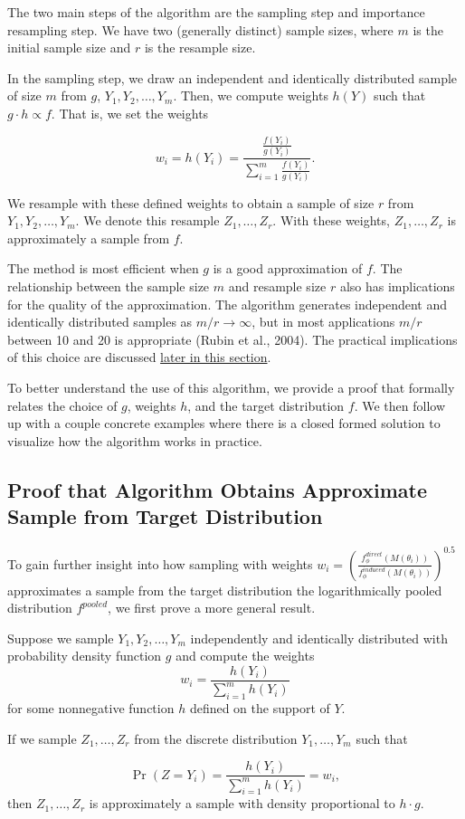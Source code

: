 \documentclass[12pt,twoside]{smiththesis}
\begin{document}
The two main steps of the algorithm are the sampling step and importance resampling step. We have two (generally distinct) sample sizes, where \(m\) is the initial sample size and \(r\) is the resample size.

In the sampling step, we draw an independent and identically distributed sample of size \(m\) from \(g\), \(Y_1, Y_2, \dots, Y_m\). Then, we compute weights \(h(Y)\) such that \(g \cdot h \propto f\). That is, we set the weights

\[w_i = h(Y_i) = \dfrac{\frac{f(Y_i) } {g(Y_i)} }{\sum_{i=1}^m\frac{f(Y_i) } {g(Y_i)} }.\]

We resample with these defined weights to obtain a sample of size \(r\) from \(Y_1, Y_2, \dots, Y_m\). We denote this resample \(Z_1,\dots, Z_r\). With these weights, \(Z_1,\dots, Z_r\) is approximately a sample from \(f\).

The method is most efficient when \(g\) is a good approximation of \(f\). The relationship between the sample size \(m\) and resample size \(r\) also has implications for the quality of the approximation. The algorithm generates independent and identically distributed samples as \(m/r \to \infty\), but in most applications \(m/r\) between 10 and 20 is appropriate (Rubin et al., 2004). The practical implications of this choice are discussed \protect\hyperlink{presamp}{later in this section}.

To better understand the use of this algorithm, we provide a proof that formally relates the choice of \(g\), weights \(h\), and the target distribution \(f\). We then follow up with a couple concrete examples where there is a closed formed solution to visualize how the algorithm works in practice.

\hypertarget{proof}{%
\subsection{Proof that Algorithm Obtains Approximate Sample from Target Distribution}\label{proof}}

To gain further insight into how sampling with weights
\(w_i = \left( \frac{f_\phi^{direct}(M(\theta_i))}{f_\phi^{induced}(M(\theta_i))} \right)^{0.5}\)
approximates a sample from the target distribution the logarithmically pooled distribution \(f^{pooled}\), we first prove a more general result.
\begin{tcolorbox}[title=Sampling $g$ with weights defined by $h$]
Suppose we sample $Y_1, Y_2, \dots, Y_m$ independently and identically distributed with probability density function  $g$ and compute the weights
\[ w_i =\dfrac{h(Y_i)}{\sum_{i=1}^mh(Y_i) }\]
for some nonnegative function $h$ defined on the support of $Y$.

If  we sample $Z_1, \dots, Z_r$ from the discrete distribution $Y_1,\dots, Y_m$ such that 

\[ \Pr(Z = Y_i) = \dfrac{h(Y_i)}{\sum_{i=1}^mh(Y_i) } = w_i ,\]
then $Z_1, \dots, Z_r$ is approximately a sample with density proportional to $h \cdot g$.

\end{tcolorbox}
\vspace{5 mm}
\end{document}
